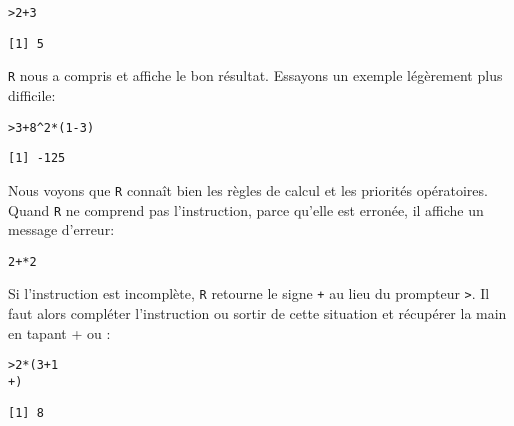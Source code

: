 \documentclass[11pt]{article}
\makeatletter
\numberwithin{equation}{section}
\theoremstyle{remark}
\newenvironment{kframe}{%
 \def\at@end@of@kframe{}%
 \ifinner\ifhmode%
  \def\at@end@of@kframe{\end{minipage}}%
  \begin{minipage}{\columnwidth}%
 \fi\fi%
 \def\FrameCommand##1{\hskip\@totalleftmargin \hskip-\fboxsep
 \colorbox{shadecolor}{##1}\hskip-\fboxsep
     \hskip-\linewidth \hskip-\@totalleftmargin \hskip\columnwidth}%
 \MakeFramed {\advance\hsize-\width
   \@totalleftmargin\z@ \linewidth\hsize
   \@setminipage}}%
 {\par\unskip\endMakeFramed%
 \at@end@of@kframe}
\newenvironment{knitrout}{}{}
\newcommand{\hlnum}[1]{\textcolor[rgb]{0.43,0.21,0.1}{#1}}%
\newcommand{\hlopt}[1]{\textcolor[rgb]{0,0,0}{#1}}%
\newcommand{\hlstd}[1]{\textcolor[rgb]{0,0.2,0.4}{#1}}%
\makeatother
\begin{document}
\begin{knitrout}
\color{fgcolor}\begin{kframe}
\begin{alltt}
\hlstd{> }\hlnum{2}\hlopt{+}\hlnum{3}
\end{alltt}
\begin{verbatim}
[1] 5
\end{verbatim}
\end{kframe}
\end{knitrout}
\texttt R nous  a compris et affiche le bon résultat. Essayons un exemple légèrement plus difficile:
\begin{knitrout}
\color{fgcolor}\begin{kframe}
\begin{alltt}
\hlstd{> }\hlnum{3}\hlopt{+}\hlnum{8}\hlopt{^}\hlnum{2}\hlopt{*}\hlstd{(}\hlnum{1}\hlopt{-}\hlnum{3}\hlstd{)}
\end{alltt}
\begin{verbatim}
[1] -125
\end{verbatim}
\end{kframe}
\end{knitrout}
Nous voyons que \texttt R connaît bien les règles de calcul et les priorités opératoires. 
Quand \texttt R ne comprend pas l'instruction, parce qu'elle est erronée, il affiche un message d'erreur:
\begin{knitrout}
\color{fgcolor}\begin{kframe}
\begin{alltt}
2+*2
\end{alltt}


{\ttfamily\noindent\bfseries{}}\end{kframe}
\end{knitrout}
Si l'instruction est incomplète, \texttt R retourne le signe \texttt + au lieu du prompteur \texttt >. Il faut alors compléter l'instruction ou sortir de cette situation et récupérer la main en tapant  +  ou : 
\begin{knitrout}
\color{fgcolor}\begin{kframe}
\begin{alltt}
\hlstd{> }\hlnum{2}\hlopt{*}\hlstd{(}\hlnum{3}\hlopt{+}\hlnum{1}
\hlstd{+ }\hlstd{)}
\end{alltt}
\begin{verbatim}
[1] 8
\end{verbatim}
\end{kframe}
\end{knitrout}
\end{document}
